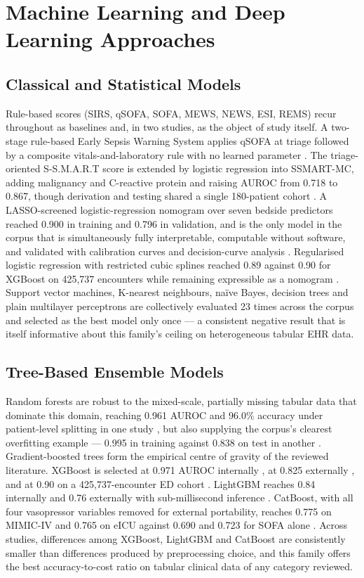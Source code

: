 \documentclass[conference]{IEEEtran}
\begin{document}
\section{Machine Learning and Deep Learning Approaches}

\subsection{Classical and Statistical Models}

Rule-based scores (SIRS, qSOFA, SOFA, MEWS, NEWS, ESI, REMS) recur throughout as baselines and, in two studies, as the object of study itself. A two-stage rule-based Early Sepsis Warning System applies qSOFA at triage followed by a composite vitals-and-laboratory rule with no learned parameter \cite{r28}. The triage-oriented S-S.M.A.R.T score is extended by logistic regression into SSMART-MC, adding malignancy and C-reactive protein and raising AUROC from 0.718 to 0.867, though derivation and testing shared a single 180-patient cohort \cite{r24}. A LASSO-screened logistic-regression nomogram over seven bedside predictors reached 0.900 in training and 0.796 in validation, and is the only model in the corpus that is simultaneously fully interpretable, computable without software, and validated with calibration curves and decision-curve analysis \cite{r20}. Regularised logistic regression with restricted cubic splines reached 0.89 against 0.90 for XGBoost on 425,737 encounters while remaining expressible as a nomogram \cite{r27}. Support vector machines, K-nearest neighbours, na\"ive Bayes, decision trees and plain multilayer perceptrons are collectively evaluated 23 times across the corpus and selected as the best model only once \cite{r29} --- a consistent negative result that is itself informative about this family's ceiling on heterogeneous tabular EHR data.

\subsection{Tree-Based Ensemble Models}

Random forests are robust to the mixed-scale, partially missing tabular data that dominate this domain, reaching 0.961 AUROC and 96.0\% accuracy under patient-level splitting in one study \cite{r30}, but also supplying the corpus's clearest overfitting example --- 0.995 in training against 0.838 on test in another \cite{r21}. Gradient-boosted trees form the empirical centre of gravity of the reviewed literature. XGBoost is selected at 0.971 AUROC internally \cite{r15}, at 0.825 externally \cite{r21}, and at 0.90 on a 425,737-encounter ED cohort \cite{r27}. LightGBM reaches 0.84 internally and 0.76 externally with sub-millisecond inference \cite{r23}. CatBoost, with all four vasopressor variables removed for external portability, reaches 0.775 on MIMIC-IV and 0.765 on eICU against 0.690 and 0.723 for SOFA alone \cite{r17}. Across studies, differences among XGBoost, LightGBM and CatBoost are consistently smaller than differences produced by preprocessing choice, and this family offers the best accuracy-to-cost ratio on tabular clinical data of any category reviewed.
\end{document}
